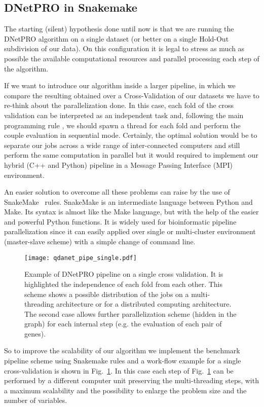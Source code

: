\documentclass{standalone}
\begin{document}
\subsection[Pipeline]{DNetPRO in Snakemake}\label{implementation:snakemake}

The starting (silent) hypothesis done until now is that we are running the DNetPRO algorithm on a single dataset (or better on a single Hold-Out subdivision of our data).
On this configuration it is legal to stress as much as possible the available computational resources and parallel processing each step of the algorithm.

If we want to introduce our algorithm inside a larger pipeline, in which we compare the resulting obtained over a Cross-Validation of our datasets we have to re-think about the parallelization done.
In this case, each fold of the cross validation can be interpreted as an independent task and, following the main programming rule \emph{}, we should spawn a thread for each fold and perform the couple evaluation in sequential mode.
Certainly, the optimal solution would be to separate our jobs across a wide range of inter-connected computers and still perform the same computation in parallel but it would required to implement our hybrid (\textsf{C++} and \textsf{Python}) pipeline in a Message Passing Interface (MPI) environment.

An easier solution to overcome all these problems can raise by the use of \textsf{SnakeMake}~\cite{snakemake} rules.
\textsf{SnakeMake} is an intermediate language between \textsf{Python} and \textsf{Make}.
Its syntax is almost like the \textsf{Make} language, but with the help of the easier and powerful \textsf{Python} functions.
It is widely used for bioinformatic pipeline parallelization since it can easily applied over single or multi-cluster environment (master-slave scheme) with a simple change of command line.

\begin{center}
\begin{figure}[htbp]
\hspace{-2cm}
\texttt{[image: qdanet\_pipe\_single.pdf]}
\caption{Example of DNetPRO pipeline on a single cross validation.
It is highlighted the independence of each fold from each other.
This scheme shows a possible distribution of the jobs on a multi-threading architecture or for a distributed computing architecture.
The second case allows further parallelization scheme (hidden in the graph) for each internal step (e.g. the evaluation of each pair of genes).
}
\label{fig:dnet_workflow}
\end{figure}
\end{center}

So to improve the scalability of our algorithm we implement the benchmark pipeline scheme using Snakemake rules and a work-flow example for a single cross-validation is shown in Fig.~\ref{fig:dnet_workflow}.
In this case each step of Fig.~\ref{fig:dnet_workflow} can be performed by a different computer unit preserving the multi-threading steps, with a maximum scalability and the possibility to enlarge the problem size and the number of variables.
\end{document}
